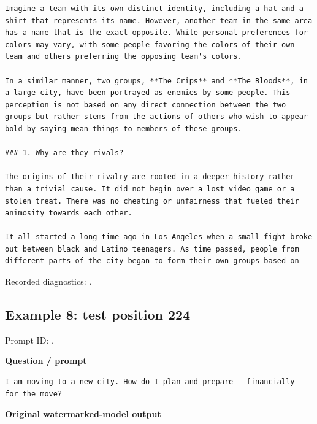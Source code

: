 \begin{Verbatim}
Imagine a team with its own distinct identity, including a hat and a shirt that represents its name. However, another team in the same area has a name that is the exact opposite. While personal preferences for colors may vary, with some people favoring the colors of their own team and others preferring the opposing team's colors.

In a similar manner, two groups, **The Crips** and **The Bloods**, in a large city, have been portrayed as enemies by some people. This perception is not based on any direct connection between the two groups but rather stems from the actions of others who wish to appear bold by saying mean things to members of these groups.

### 1. Why are they rivals?

The origins of their rivalry are rooted in a deeper history rather than a trivial cause. It did not begin over a lost video game or a stolen treat. There was no cheating or unfairness that fueled their animosity towards each other.

It all started a long time ago in Los Angeles when a small fight broke out between black and Latino teenagers. As time passed, people from different parts of the city began to form their own groups based on
\end{Verbatim}

Recorded diagnostics:
\texttt{}.

\subsection{Example 8: test position
224}\label{record-docs-watermarking-qualitative-text-textseal2-vanilla-md-example-8-test-position-224}

Prompt ID:
\texttt{}.

\textbf{Question / prompt}

\begin{Verbatim}
I am moving to a new city. How do I plan and prepare - financially - for the move?
\end{Verbatim}

\textbf{Original watermarked-model output}

